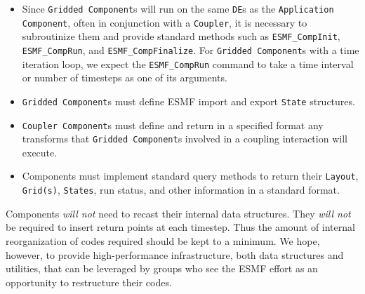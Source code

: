 \begin{itemize}
\item Since {\tt Gridded Component}s will run on the same 
{\tt DE}s as the {\tt Application Component}, often in conjunction 
with a {\tt Coupler}, 
it is necessary to subroutinize
them and provide standard methods such as {\tt ESMF\_CompInit}, 
{\tt ESMF\_CompRun}, and {\tt ESMF\_CompFinalize}.  For {\tt Gridded 
Component}s
with a time iteration loop, we expect the {\tt ESMF\_CompRun} command to 
take a time interval or number of timesteps as one of its arguments.
\item {\tt Gridded Component}s must define ESMF import and export {\tt State} 
structures.
\item {\tt Coupler Component}s must define and return in a specified 
format any transforms that {\tt Gridded Component}s involved 
in a coupling interaction will execute.
\item Components must implement standard query methods to return
their {\tt Layout}, {\tt Grid(s)}, {\tt States}, run status, and other 
information in a standard format.
\end{itemize}

Components {\it will not} need to recast their internal data structures.
They {\it will not} be required to insert return points at each timestep.
Thus the amount of internal reorganization of codes required should be 
kept to a minimum.  We hope, however, to provide high-performance infrastructure,
both data structures and utilities, that can be leveraged by groups who see
the ESMF effort as an opportunity to restructure their codes.



